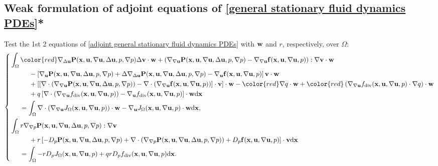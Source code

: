 \documentclass[oneside,11pt]{book}
\numberwithin{equation}{section}
\begin{document}
\subsection{Weak formulation of adjoint equations of \eqref{general stationary fluid dynamics PDEs}*}
Test the 1st 2 equations of \eqref{adjoint general stationary fluid dynamics PDEs} with ${\bf w}$ and $r$, respectively, over $\Omega$:
\begin{equation*}
    \left\{\begin{split}
        &\int_\Omega {\color{red}\nabla_{\Delta{\bf u}}{\bf P}({\bf x},{\bf u},\nabla{\bf u},\Delta{\bf u},p,\nabla p)\Delta{\bf v}\cdot{\bf w}} + \left(\nabla_{\nabla{\bf u}}{\bf P}({\bf x},{\bf u},\nabla{\bf u},\Delta{\bf u},p,\nabla p) - \nabla_{\nabla{\bf u}}{\bf f}({\bf x},{\bf u},\nabla{\bf u},p)\right):\nabla{\bf v}\cdot{\bf w}\\
        &\hspace{1cm}- \left[\nabla_{\bf u}{\bf P}({\bf x},{\bf u},\nabla{\bf u},\Delta{\bf u},p,\nabla p) + \Delta\nabla_{\Delta{\bf u}}{\bf P}({\bf x},{\bf u},\nabla{\bf u},\Delta{\bf u},p,\nabla p) - \nabla_{\bf u}{\bf f}({\bf x},{\bf u},\nabla{\bf u},p)\right]{\bf v}\cdot{\bf w}\\
        &\hspace{1cm}+ \left[\left[\nabla\cdot\left(\nabla_{\nabla{\bf u}}{\bf P}({\bf x},{\bf u},\nabla{\bf u},\Delta{\bf u},p,\nabla p)\right) - \nabla\cdot\left(\nabla_{\nabla{\bf u}}{\bf f}({\bf x},{\bf u},\nabla{\bf u},p)\right)\right]\cdot{\bf v}\right]\cdot{\bf w} - {\color{red}\nabla q\cdot{\bf w}} + {\color{red}\left(\nabla_{\nabla{\bf u}}f_{\rm div}({\bf x},{\bf u},\nabla{\bf u},p)\cdot\nabla q\right)\cdot{\bf w}}\\
        &\hspace{1cm}+ q\left[\nabla\cdot\left(\nabla_{\nabla{\bf u}}f_{\rm div}({\bf x},{\bf u},\nabla{\bf u},p)\right) - \nabla_{\bf u}f_{\rm div}({\bf x},{\bf u},\nabla{\bf u},p)\right]\cdot{\bf w}{\rm d}{\bf x}\\
        &\hspace{5mm} = \int_\Omega \nabla\cdot\left(\nabla_{\nabla{\bf u}}J_\Omega({\bf x},{\bf u},\nabla{\bf u},p)\right)\cdot{\bf w} - \nabla_{\bf u}J_\Omega({\bf x},{\bf u},\nabla{\bf u},p)\cdot{\bf w}{\rm d}{\bf x},\\
        &\int_\Omega r\nabla_{\nabla p}{\bf P}({\bf x},{\bf u},\nabla{\bf u},\Delta{\bf u},p,\nabla p):\nabla{\bf v}\\
        &\hspace{1cm} + r\left[-D_p{\bf P}({\bf x},{\bf u},\nabla{\bf u},\Delta{\bf u},p,\nabla p) + \nabla\cdot\left(\nabla_{\nabla p}{\bf P}({\bf x},{\bf u},\nabla{\bf u},\Delta{\bf u},p,\nabla p)\right) + D_p{\bf f}({\bf x},{\bf u},\nabla{\bf u},p)\right]\cdot{\bf v}{\rm d}{\bf x}\\
        &\hspace{5mm} = \int_\Omega - rD_pJ_\Omega ({\bf x},{\bf u},\nabla{\bf u},p) + qrD_pf_{\rm div}({\bf x},{\bf u},\nabla{\bf u},p){\rm d}{\bf x}.
    \end{split}\right.
\end{equation*}
\end{document}
